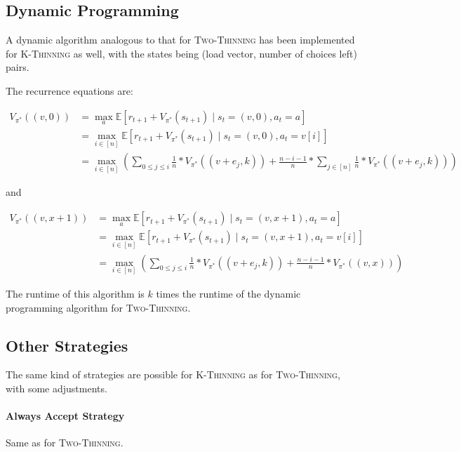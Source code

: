 \subsection{Dynamic Programming}


A dynamic algorithm analogous to that for \textsc{Two-Thinning} has been implemented for \textsc{K-Thinning} as well, with the states being (load vector, number of choices left) pairs.


The recurrence equations are:


\begin{equation} \label{eq:kthinning-dynamicprogramming-0left}
\begin{split}
    V_{\pi^*}((v, 0)) &= \max_a \mathbb{E} [r_{t+1} + V_{\pi^*}(s_{t+1}) \mid s_t=(v,0), a_t=a] \\
    &= \max_{i \in [n]} \mathbb{E} [r_{t+1} + V_{\pi^*}(s_{t+1}) \mid s_t=(v,0), a_t=v[i]] \\
    &= \max_{i \in [n]} (\sum_{0\leq j \leq i} \frac{1}{n}*V_{\pi^*}((v+e_j,k)) + \frac{n-i-1}{n} * \sum_{j \in [n]} \frac{1}{n}*V_{\pi^*}((v+e_j,k)))
\end{split}
\end{equation}


and 


\begin{equation} \label{eq:kthinning-dynamicprogramming-xleft}
\begin{split}
    V_{\pi^*}((v, x+1)) &= \max_a \mathbb{E} [r_{t+1} + V_{\pi^*}(s_{t+1}) \mid s_t=(v,x+1), a_t=a] \\
    &= \max_{i \in [n]} \mathbb{E} [r_{t+1} + V_{\pi^*}(s_{t+1}) \mid s_t=(v, x+1), a_t=v[i]] \\
    &= \max_{i \in [n]} (\sum_{0\leq j \leq i} \frac{1}{n}*V_{\pi^*}((v+e_j,k)) + \frac{n-i-1}{n} * V_{\pi^*}((v, x)))
\end{split}
\end{equation}

The runtime of this algorithm is $k$ times the runtime of the dynamic programming algorithm for \textsc{Two-Thinning}.


\subsection{Other Strategies}

The same kind of strategies are possible for \textsc{K-Thinning} as for \textsc{Two-Thinning}, with some adjustments.

\paragraph{Always Accept Strategy} Same as for \textsc{Two-Thinning}.


